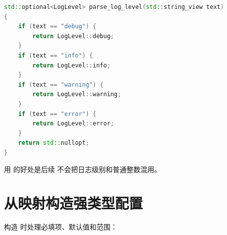\begin{lstlisting}[language=C++,caption={解析日志级别}]
std::optional<LogLevel> parse_log_level(std::string_view text)
{
    if (text == "debug") {
        return LogLevel::debug;
    }
    if (text == "info") {
        return LogLevel::info;
    }
    if (text == "warning") {
        return LogLevel::warning;
    }
    if (text == "error") {
        return LogLevel::error;
    }
    return std::nullopt;
}
\end{lstlisting}

用  的好处是后续  不会把日志级别和普通整数混用。

\section{从映射构造强类型配置}

构造  时处理必填项、默认值和范围：

